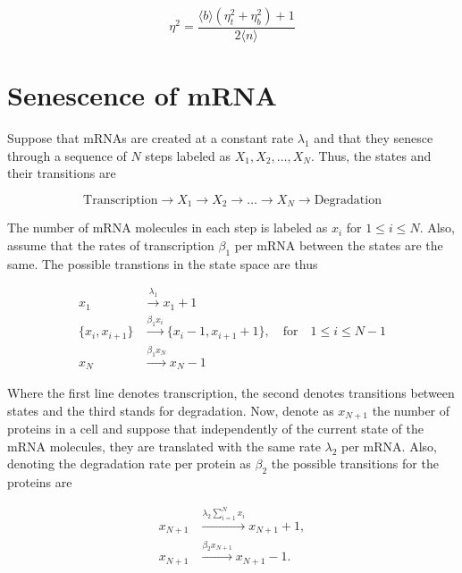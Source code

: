 
\begin{equation}
  \boxed{\eta^2 = \frac{\langle b\rangle\left(\eta^2_t + \eta^2_b\right)+1}{2\langle n\rangle}}
\end{equation}


\section{Senescence of mRNA}

Suppose that mRNAs are created at a constant rate $\lambda_1$ and that they senesce through a sequence of $N$ steps labeled as $X_1,X_2,\dotsc,X_N$. Thus, the states and their transitions are

\begin{equation}
  \text{Transcription} \rightarrow X_1 \rightarrow X_2 \rightarrow \dots \rightarrow X_N \rightarrow \text{Degradation}
\end{equation}

The number of mRNA molecules in each step is labeled as $x_i$ for $1\leq i\leq N$. Also, assume that the rates of transcription $\beta_1$ per mRNA between the states are the same. The possible transtions in the state space are thus

\begin{equation}
  \begin{split}
    x_1&\xrightarrow{\lambda_1}x_1+1\\
    \{x_i,x_{i+1}\}&\xrightarrow{\beta_1x_i} \{x_i-1,x_{i+1}+1\},\quad \text{for}\quad1\leq i\leq N-1\\
    x_N&\xrightarrow{\beta_1x_N} x_N-1
  \end{split}
\end{equation}

Where the first line denotes transcription, the second denotes transitions between states and the third stands for degradation. Now, denote as $x_{N+1}$ the number of proteins in a cell and suppose that independently of the current state of the mRNA molecules, they are translated with the same rate $\lambda_2$ per mRNA. Also, denoting the degradation rate per protein as $\beta_2$ the possible transitions for the proteins are

\begin{equation}
  \begin{split}
    x_{N+1} &\xrightarrow{\lambda_2\sum_{i=1}^Nx_i} x_{N+1}+1,\\
    x_{N+1} &\xrightarrow{\beta_2x_{N+1}}x_{N+1}-1.
  \end{split}
\end{equation}

